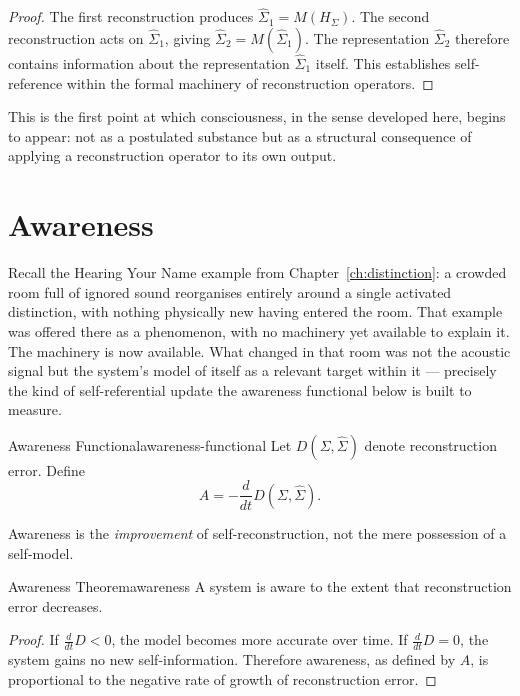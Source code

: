 \documentclass[12pt,twoside,openright]{book}
\begin{document}
\begin{proof}
  The first reconstruction produces $\hat{\Sigma}_1 = M(H_\Sigma)$.
  The second reconstruction acts on $\hat{\Sigma}_1$, giving
  $\hat{\Sigma}_2 = M(\hat{\Sigma}_1)$. The representation
  $\hat{\Sigma}_2$ therefore contains information about the
  representation $\hat{\Sigma}_1$ itself. This establishes
  self-reference within the formal machinery of
  reconstruction operators.
\end{proof}

This is the first point at which consciousness, in the
sense developed here, begins to appear: not as a postulated
substance but as a structural consequence of applying a
reconstruction operator to its own output.

\section{Awareness}
\label{sec:ch21-awareness}

Recall the Hearing Your Name example from
Chapter~\ref{ch:distinction}: a crowded room full of ignored
sound reorganises entirely around a single activated
distinction, with nothing physically new having entered the
room. That example was offered there as a phenomenon, with no
machinery yet available to explain it. The machinery is now
available. What changed in that room was not the acoustic
signal but the system's model of itself as a relevant target
within it --- precisely the kind of self-referential update
the awareness functional below is built to measure.

\begin{definition}{Awareness Functional}{awareness-functional}
  Let $D(\Sigma, \hat{\Sigma})$ denote reconstruction error.
  Define
  \[
    A = -\frac{d}{dt} D(\Sigma, \hat{\Sigma}).
  \]
\end{definition}

Awareness is the \emph{improvement} of self-reconstruction,
not the mere possession of a self-model.

\begin{theorem}{Awareness Theorem}{awareness}
  A system is aware to the extent that reconstruction error
  decreases.
\end{theorem}

\begin{proof}
  If $\frac{d}{dt}D < 0$, the model becomes more accurate
  over time. If $\frac{d}{dt}D = 0$, the system gains no new
  self-information. Therefore awareness, as defined by $A$,
  is proportional to the negative rate of growth of
  reconstruction error.
\end{proof}
\end{document}

